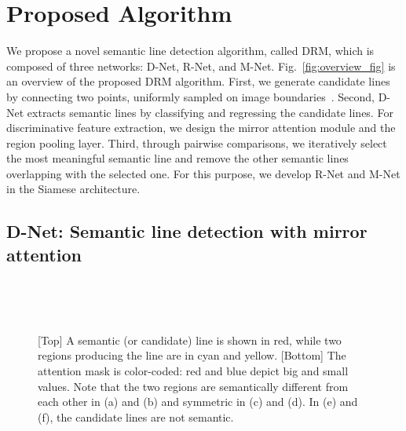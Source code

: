 \documentclass[runningheads]{llncs}
\begin{document}
\section{Proposed Algorithm}
We propose a novel semantic line detection algorithm, called DRM, which is composed of three networks: D-Net, R-Net, and M-Net. Fig.~\ref{fig:overview_fig} is an overview of the proposed DRM algorithm. First, we generate candidate lines by connecting two points, uniformly sampled on image boundaries~\cite{lee2017}. Second, D-Net extracts semantic lines by classifying and regressing the candidate lines. For discriminative feature extraction, we design the mirror attention module and the region pooling layer. Third, through pairwise comparisons, we iteratively select the most meaningful semantic line and remove the other semantic lines overlapping with the selected one. For this purpose, we develop R-Net and M-Net in the Siamese architecture.

\subsection{D-Net: Semantic line detection with mirror attention}


\begin{figure*}[t]

    \centering
    \,\!\!
    \,\!\!
    \,\!\!    \,\!\!
    \,\!\!
    \\[-2.5ex]
    \addtocounter{subfigure}{-6}
    \,\!\!
    \,\!\!
    \,\!\!
    \,\!\!
    \,\!\!
    \\[-1ex]
    \caption
    {
      [Top] A semantic (or candidate) line is shown in red, while two regions producing the line are in cyan and yellow. [Bottom] The attention mask is color-coded: red and blue depict big and small values. Note that the two regions are semantically different from each other in (a) and (b) and symmetric in (c) and (d). In (e) and (f), the candidate lines are not semantic.
    }
    \label{fig:Attmap}
\end{figure*}
\end{document}
